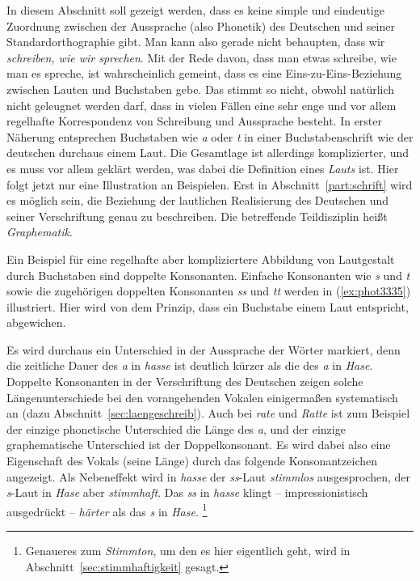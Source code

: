 \label{sec:orthographiegraphematik}


In diesem Abschnitt soll gezeigt werden, dass es keine simple und eindeutige Zuordnung zwischen der Aussprache (also Phonetik) des Deutschen und seiner Standardorthographie gibt.
Man kann also gerade nicht behaupten, dass wir \textit{schreiben, wie wir sprechen}.
Mit der Rede davon, dass man etwas schreibe, wie man es spreche, ist wahrscheinlich gemeint, dass es eine Eins-zu-Eins-Beziehung zwischen Lauten und Buchstaben gebe. 
Das stimmt so nicht, obwohl natürlich nicht geleugnet werden darf, dass in vielen Fällen eine sehr enge und vor allem regelhafte Korrespondenz von Schreibung und Aussprache besteht.
In erster Näherung entsprechen Buchstaben wie \textit{a} oder \textit{t} in einer Buchstabenschrift wie der deutschen durchaus einem Laut. 
Die Gesamtlage ist allerdings komplizierter, und es muss vor allem geklärt werden, was dabei die Definition eines \textit{Lauts} ist.  
Hier folgt jetzt nur eine Illustration an Beispielen.
Erst in Abschnitt~\ref{part:schrift} wird es möglich sein, die Beziehung der lautlichen Realisierung des Deutschen und seiner Verschriftung genau zu beschreiben.
Die betreffende Teildisziplin heißt \textit{Graphematik}.

Ein Beispiel für eine regelhafte aber kompliziertere Abbildung von Lautgestalt durch Buchstaben sind doppelte Konsonanten.
Einfache Konsonanten wie \textit{s} und \textit{t} sowie die zugehörigen doppelten Konsonanten \textit{ss} und \textit{tt} werden in (\ref{ex:phot3335}) illustriert.
Hier wird von dem Prinzip, dass ein Buchstabe einem Laut entspricht, abgewichen.

\begin{exe}
  \ex\label{ex:phot3335}
  \begin{xlist}
  \end{xlist}
\end{exe}

Es wird durchaus ein Unterschied in der Aussprache der Wörter markiert, denn die zeitliche Dauer des \textit{a} in \textit{hasse} ist deutlich kürzer als die des \textit{a} in \textit{Hase}.
Doppelte Konsonanten in der Verschriftung des Deutschen zeigen solche Längenunterschiede bei den vorangehenden Vokalen einigermaßen systematisch an (dazu Abschnitt~\ref{sec:laengeschreib}).
Auch bei \textit{rate} und \textit{Ratte} ist zum Beispiel der einzige phonetische Unterschied die Länge des \textit{a}, und der einzige graphematische Unterschied ist der Doppelkonsonant.
Es wird dabei also eine Eigenschaft des Vokals (seine Länge) durch das folgende Konsonantzeichen angezeigt.
Als Nebeneffekt wird in \textit{hasse} der \textit{ss}-Laut \textit{stimmlos} ausgesprochen, der \textit{s}-Laut in \textit{Hase} aber \textit{stimmhaft}.
Das \textit{ss} in \textit{hasse} klingt -- impressionistisch ausgedrückt -- \textit{härter} als das \textit{s} in \textit{Hase}.%
\footnote{Genaueres zum \textit{Stimmton}, um den es hier eigentlich geht, wird in Abschnitt~\ref{sec:stimmhaftigkeit} gesagt.}

